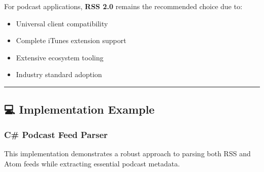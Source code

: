 \documentclass[
  letterpaper,
  DIV=11,
  numbers=noendperiod]{scrartcl}
\providecommand{\tightlist}{%
  \setlength{\itemsep}{0pt}\setlength{\parskip}{0pt}}\usepackage{longtable,booktabs,array}
\begin{document}
For podcast applications, \textbf{RSS 2.0} remains the recommended
choice due to:

\begin{itemize}
\tightlist
\item
  Universal client compatibility
\item
  Complete iTunes extension support
\item
  Extensive ecosystem tooling
\item
  Industry standard adoption
\end{itemize}

\begin{center}\rule{0.5\linewidth}{0.5pt}\end{center}

\subsection{💻 Implementation Example}\label{implementation-example}

\subsubsection{C\# Podcast Feed Parser}\label{c-podcast-feed-parser}

This implementation demonstrates a robust approach to parsing both RSS
and Atom feeds while extracting essential podcast metadata.
\end{document}
